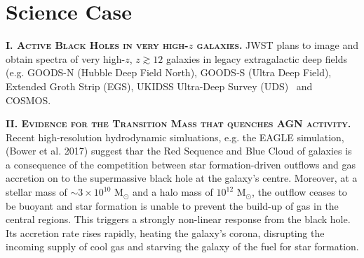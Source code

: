 \documentclass[11pt,epsf]{article}
\begin{document}
\newpage
\medskip
\medskip

\section{Science Case}

\smallskip
\smallskip
\noindent
\textbf{\textsc{I. Active Black Holes in very high-$z$ galaxies.}} 
JWST plans to image and obtain spectra of very high-$z$, $z\gtrsim12$
galaxies in legacy extragalactic deep fields (e.g. GOODS-N (Hubble
Deep Field North), GOODS‐S (Ultra Deep Field), Extended Groth Strip
(EGS), UKIDSS Ultra-Deep Survey (UDS) \ and COSMOS.


\medskip
\medskip


\smallskip
\smallskip
\noindent
\textbf{\textsc{II. Evidence for the Transition Mass that quenches AGN activity.}} 
Recent high-resolution hydrodynamic simluations, e.g. the EAGLE
simulation, (Bower et al. 2017) suggest thar the Red Sequence and Blue
Cloud of galaxies is a consequence of the competition between star
formation-driven outflows and gas accretion on to the supermassive
black hole at the galaxy’s centre.  Moreover, at a stellar mass of
$\sim3{\times}10^{10}$ M$_{\odot}$ and a halo mass of $10^{12}$
M$_{\odot}$, the outflow ceases to be buoyant and star formation is
unable to prevent the build-up of gas in the central regions. This
triggers a strongly non-linear response from the black hole. Its
accretion rate rises rapidly, heating the galaxy’s corona, disrupting
the incoming supply of cool gas and starving the galaxy of the fuel
for star formation.



\medskip
\medskip
\end{document}
